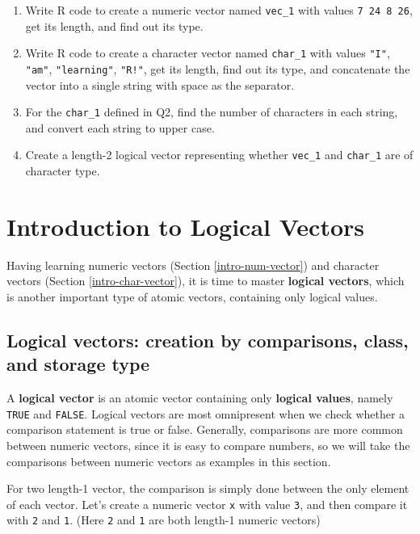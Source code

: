 \documentclass[
]{book}
\begin{document}
\begin{enumerate}
\def\labelenumi{\arabic{enumi}.}
\item
  Write R code to create a numeric vector named \texttt{vec\_1} with values \texttt{7\ 24\ 8\ 26}, get its length, and find out its type.
\item
  Write R code to create a character vector named \texttt{char\_1} with values \texttt{"I"}, \texttt{"am"}, \texttt{"learning"}, \texttt{"R!"}, get its length, find out its type, and concatenate the vector into a single string with space as the separator.
\item
  For the \texttt{char\_1} defined in Q2, find the number of characters in each string, and convert each string to upper case.
\item
  Create a length-2 logical vector representing whether \texttt{vec\_1} and \texttt{char\_1} are of character type.
\end{enumerate}

\hypertarget{intro-logi-vector}{%
\section{Introduction to Logical Vectors}\label{intro-logi-vector}}

Having learning numeric vectors (Section \ref{intro-num-vector}) and character vectors (Section \ref{intro-char-vector}), it is time to master \textbf{logical vectors}, which is another important type of atomic vectors, containing only logical values.

\hypertarget{create-logical-vector}{%
\subsection{Logical vectors: creation by comparisons, class, and storage type}\label{create-logical-vector}}

A \textbf{logical vector} is an atomic vector containing only \textbf{logical values}, namely \texttt{TRUE} and \texttt{FALSE}. Logical vectors are most omnipresent when we check whether a comparison statement is true or false. Generally, comparisons are more common between numeric vectors, since it is easy to compare numbers, so we will take the comparisons between numeric vectors as examples in this section.

For two length-1 vector, the comparison is simply done between the only element of each vector. Let's create a numeric vector \texttt{x} with value \texttt{3}, and then compare it with \texttt{2} and \texttt{1}. (Here \texttt{2} and \texttt{1} are both length-1 numeric vectors)
\end{document}

